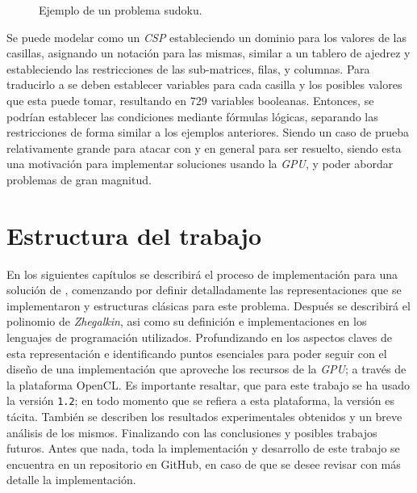 \begin{figure}
  \centering
  \caption{Ejemplo de un problema sudoku.}
  \label{fig:sudoku}
\end{figure}

Se puede modelar como un \textit{CSP} estableciendo un dominio para los valores de las casillas, asignando un notación para las mismas, similar a un tablero de ajedrez y estableciendo las restricciones de las sub-matrices, filas, y columnas. Para traducirlo a \sat se deben establecer variables para cada casilla y los posibles valores que esta puede tomar, resultando en $729$ variables booleanas. Entonces, se podrían establecer las condiciones mediante fórmulas lógicas, separando las restricciones de forma similar a los ejemplos anteriores. Siendo un caso de prueba relativamente grande para atacar con \sat y en general para ser resuelto, siendo esta una motivación para implementar soluciones usando la \textit{GPU}, y poder abordar problemas de gran magnitud.

\section{Estructura del trabajo}

En los siguientes capítulos se describirá el proceso de implementación para una solución de \sat, comenzando por definir detalladamente las representaciones que se implementaron y estructuras clásicas para este problema. Después se describirá el polinomio de \textit{Zhegalkin}, asi como su definición e implementaciones en los lenguajes de programación utilizados. Profundizando en los aspectos claves de esta representación e identificando puntos esenciales para poder seguir con el diseño de una implementación que aproveche los recursos de la \textit{GPU}; a través de la plataforma OpenCL. Es importante resaltar, que para este trabajo se ha usado la versión \texttt{1.2}; en todo momento que se refiera a esta plataforma, la versión es tácita. También se describen los resultados experimentales obtenidos y un breve análisis de los mismos. Finalizando con las conclusiones y posibles trabajos futuros. Antes que nada, toda la implementación y desarrollo de este trabajo se encuentra en un repositorio en GitHub\cite{Lilue2018}, en caso de que se desee revisar con más detalle la implementación.
